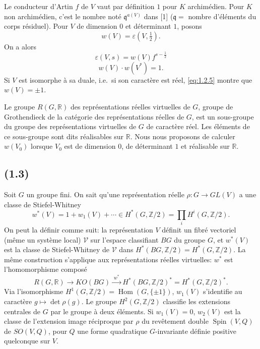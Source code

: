 \documentclass[11pt]{amsart}
\theoremstyle{plain}
\theoremstyle{definition}
\DeclareMathOperator{\Spin}{Spin}
\DeclareMathOperator{\Hom}{Hom}
\newcommand{\R}{\mathbb{R}}
\newcommand{\Z}{\mathbb{Z}}
\begin{document}
Le conducteur d'Artin $f$ de $V$ vaut par d\'efinition $1$ pour $K$ archim\'edien. Pour $K$ non archim\'edien, c'est le nombre not\'e $\mathfrak{q}^{a(V)}$ dans [1] ($\mathfrak{q}=$ nombre d'\'el\'ements du corps r\'esiduel). Pour $V$ de dimension $0$ et d\'eterminant $1$, posons
\begin{equation}\label{eq:1.2.3}
w(V)=\varepsilon(V,\tfrac12).
\end{equation}
On a alors
\begin{equation}\label{eq:1.2.4}
\varepsilon(V,s)=w(V)f^{s-\frac12}
\end{equation}
\begin{equation}\label{eq:1.2.5}
w(V)\cdot w(V^*)=1.
\end{equation}
Si $V$ est isomorphe \`a sa duale, i.e.~si son caract\`ere est r\'eel, \eqref{eq:1.2.5} montre que $w(V)=\pm1$.

Le groupe $R(G,\R)$ des repr\'esentations r\'eelles virtuelles de $G$, groupe de Grothendieck de la cat\'egorie des repr\'esentations r\'eelles de $G$, est un sous-groupe du groupe des repr\'esentations virtuelles de $G$ de caract\`ere r\'eel. Les \'el\'ements de ce sous-groupe sont dits r\'ealisables sur $\R$. Nous nous proposons de calculer $w(V_0)$ lorsque $V_0$ est de dimension $0$, de d\'eterminant $1$ et r\'ealisable sur $\R$.

\subsection{(1.3)}
Soit $G$ un groupe fini. On sait qu'une repr\'esentation r\'eelle $\rho\colon G\to GL(V)$ a une classe de Stiefel-Whitney
\[
w^*(V)=1+w_1(V)+\cdots\in H^*(G,\Z/2)=\prod_i H^i(G,\Z/2).
\]
On peut la d\'efinir comme suit: la repr\'esentation $V$ d\'efinit un fibr\'e vectoriel (m\^eme un syst\`eme local) $\mathscr{V}$ sur l'espace classifiant $BG$ du groupe $G$, et $w^*(V)$ est la classe de Stiefel-Whitney de $\mathscr{V}$ dans $H^*(BG,\Z/2)=H^*(G,\Z/2)$. La m\^eme construction s'applique aux repr\'esentations r\'eelles virtuelles: $w^*$ est l'homomorphisme compos\'e
\[
R(G,\R)\longrightarrow KO(BG)\xrightarrow{\;w^*\;}H^*(BG,\Z/2)^* = H^*(G,\Z/2)^*.
\]
Via l'isomorphisme $H^1(G,\Z/2)=\Hom(G,\{\pm1\})$, $w_1(V)$ s'identifie au caract\`ere $g\mapsto\det\rho(g)$. Le groupe $H^2(G,\Z/2)$ classifie les extensions centrales de $G$ par le groupe \`a deux \'el\'ements. Si $w_1(V)=0$, $w_2(V)$ est la classe de l'extension image r\'eciproque par $\rho$ du rev\^etement double $\Spin(V,Q)$ de $SO(V,Q)$, pour $Q$ une forme quadratique $G$-invariante d\'efinie positive quelconque sur $V$.
\end{document}
